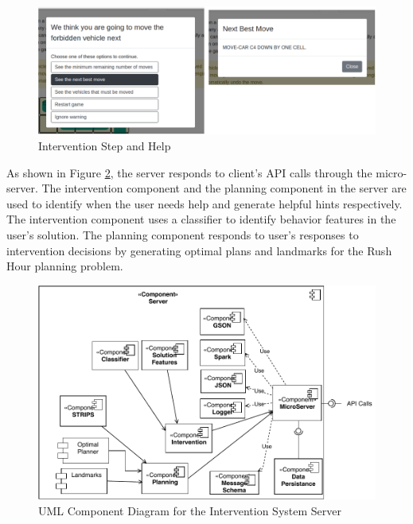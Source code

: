 \begin{figure}[!hbt]
  \centering
\includegraphics[width=\columnwidth]{img/alert.pdf}
  \caption{Intervention Step and Help}
  \label{fig:help}
\end{figure}
As shown in Figure \ref{fig:compserver}, the server responds to client's API calls through the micro-server. The intervention component and the planning component in the server are used to identify when the user needs help and generate helpful hints respectively. The intervention component uses a classifier to identify behavior features in the user's solution. The planning component responds to user's responses to intervention decisions by generating optimal plans and landmarks for the Rush Hour planning problem.

\begin{figure}[!hbt]
  \centering
\includegraphics[width=\columnwidth]{img/componentserver.pdf}
  \caption{UML Component Diagram for the Intervention System Server}
  \label{fig:compserver}
\end{figure}

